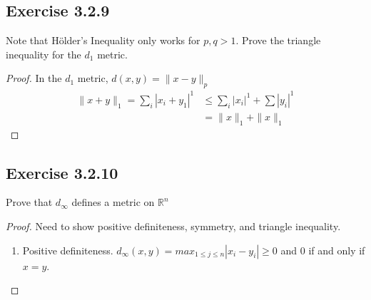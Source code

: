 \documentclass{tufte-book}
\theoremstyle{mytheoremstyle}
\theoremstyle{mylemstyle}
\theoremstyle{mydefstyle}
\begin{document}
\subsection{Exercise 3.2.9}
Note that H{\"o}lder's Inequality only works for $p,q > 1$.  Prove the triangle inequality for the $d_1$ metric.

\begin{proof}
In the $d_1$ metric, $d(x,y) = \|x-y\|_p$
\begin{align*}
 \|x+y\|_1 = \sum_i|x_i+y_1|^1 &\leq \sum_i|x_i|^1 + \sum|y_i|^1 \\
 &= \|x\|_1 + \|x\|_1
\end{align*}
\end{proof}

\subsection{Exercise 3.2.10}
Prove that $d_\infty$ defines a metric on $\mathbb{R}^n$
\begin{proof}
Need to show positive definiteness, symmetry, and triangle inequality.
\begin{enumerate}
\item Positive definiteness. $d_\infty(x,y) = max_{1\leq j\leq n}|x_i-y_i| \geq 0$ and $0$ if and only if $x = y$.
\end{enumerate}

\end{proof}
\end{document}
